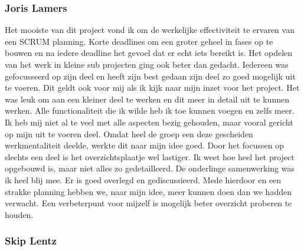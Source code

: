 \documentclass[a4paper,11pt]{article}
\begin{document}
\subsubsection{Joris Lamers}
Het mooiste van dit project vond ik om de werkelijke effectiviteit te ervaren van een SCRUM planning. Korte deadlines om een groter geheel in fases op te bouwen en na iedere deadline het gevoel dat er echt iets bereikt is. Het opdelen van het werk in kleine sub projecten ging ook beter dan gedacht. Iedereen was gefocusseerd op zijn deel en heeft zijn best gedaan zijn deel zo goed mogelijk uit te voeren. Dit geldt ook voor mij als ik kijk naar mijn inzet voor het project. Het was leuk om aan een kleiner deel te werken en dit meer in detail uit te kunnen werken. Alle functionaliteit die ik wilde heb ik toe kunnen voegen en zelfs meer. Ik heb mij niet al te veel met alle aspecten bezig gehouden, maar vooral gericht op mijn uit te voeren deel. Omdat heel de groep een deze gescheiden werkmentaliteit deelde, werkte dit naar mijn idee goed. Door het focussen op slechts een deel is het overzichtsplaatje wel lastiger. Ik weet hoe heel het project opgebouwd is, maar niet alles zo gedetailleerd. De onderlinge samenwerking was ik heel blij mee. Er is goed overlegd en gediscussieerd. Mede hierdoor en een strakke planning hebben we, naar mijn idee, meer kunnen doen dan we hadden verwacht. Een verbeterpunt voor mijzelf is mogelijk beter overzicht proberen te houden.
\subsubsection{Skip Lentz}
\end{document}
